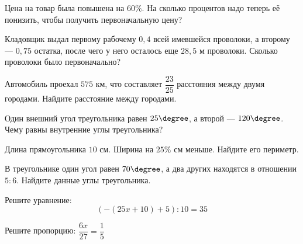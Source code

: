 \begin{exam}
	\begin{listofex}
		\item Цена на товар была повышена на \( 60\% \). На сколько процентов надо теперь её понизить, чтобы получить первоначальную цену?
		\item Кладовщик выдал первому рабочему \(0,4\) всей имевшейся проволоки, а второму --- \(0,75\) остатка, после чего у него осталось еще \(28,5\) м проволоки. Сколько проволоки было первоначально?
		\item Автомобиль проехал \(575\) км, что составляет \(\dfrac{23}{25}\) расстояния между двумя городами. Найдите расстояние между городами.
		\item Один внешний угол треугольника равен \( 25\degree \), а второй --- \( 120\degree \). Чему равны внутренние углы треугольника?
		\item Длина прямоугольника \(10\) см. Ширина на \(25\%\) см меньше. Найдите его периметр.
		\item В треугольнике один угол равен \(70 \degree\), а два других находятся в отношении \(5:6\). Найдите данные углы треугольника.
		\item Решите уравнение: \[ (-(25x+10)+5):10=35\]
		\item Решите пропорцию: \( \dfrac{6x}{27}=\dfrac{1}{5} \)
		
	\end{listofex}
\end{exam}
